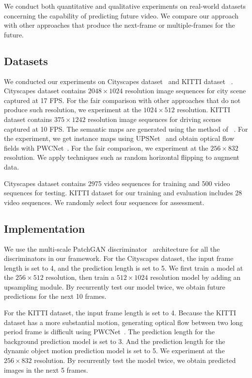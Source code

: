 \documentclass[10pt,twocolumn,letterpaper]{article}
\begin{document}
We conduct both quantitative and qualitative experiments on real-world datasets concerning the capability of predicting future video. We compare our approach with other approaches that produce the next-frame or multiple-frames for the future.

\subsection{Datasets}
We conducted our experiments on Cityscapes dataset~\cite{Cordts2016Cityscapes} and KITTI dataset ~\cite{kitti}. Cityscapes dataset contains $2048\times1024$ resolution image sequences for city scene captured at 17 FPS. For the fair comparison with other approaches that do not produce such resolution, we experiment at the  $1024\times512$ resolution.
KITTI dataset contains $375\times1242$ resolution image sequences for driving scenes captured at 10 FPS. The semantic maps are generated using the method of ~\cite{semantic_cvpr19}. For the experiment, we get instance maps using UPSNet~\cite{xiong19upsnet} and obtain optical flow fields with PWCNet~\cite{Sun2018PWC-Net}. For the fair comparison, we experiment at the $256\times832$ resolution. We apply techniques such as random horizontal flipping to augment data.

Cityscapes dataset contains 2975 video sequences for training and 500 video sequences for testing. KITTI dataset for our training and evaluation includes 28 video sequences. We randomly select four sequences for assessment. 

\subsection{Implementation}
We use the multi-scale PatchGAN discriminator~\cite{pix2pix2017} architecture for all the discriminators in our framework.
For the Cityscapes dataset, the input frame length is set to 4, and the prediction length is set to 5. We first train a model at the $256\times512$ resolution, then train a $512\times1024$ resolution model by adding an upsampling module. By recurrently test our model twice, we obtain future predictions for the next 10 frames.

For the KITTI dataset, the input frame length is set to 4. Because the KITTI dataset has a more substantial motion, generating optical flow between two long period frame is difficult using PWCNet~\cite{Sun2018PWC-Net}. The prediction length for the background prediction model is set to 3. And the prediction length for the dynamic object motion prediction model is set to 5. We experiment at the $256\times832$ resolution. By recurrently test the model twice, we obtain predicted images in the next 5 frames.
\end{document}
